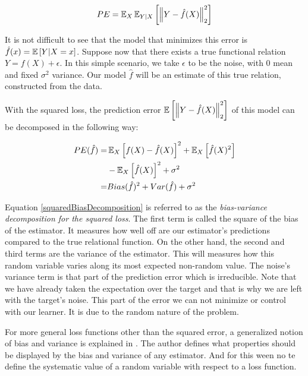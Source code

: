 \begin{equation}\label{squaredPE}
PE = \operatorname{\mathbb{E}}_X \operatorname{\mathbb{E}}_{Y|X} \left[ \left\Vert  Y - \hat{f}(X)  \right\Vert_2^2 \right]
\end{equation}

It is not difficult to see that the model that minimizes this error is $\hat{f}(x) = \operatorname{\mathbb{E}} \left[ Y | X=x \right] $. Suppose now that there exists a true functional relation $Y = f(X) + \epsilon$.
In this simple scenario, we take $\epsilon$ to be the noise, with $0$ mean and fixed $\sigma^2$ variance. Our model $\hat{f}$ will be an estimate of this true relation, constructed from the data.

With the squared loss, the prediction error $\operatorname{\mathbb{E}} \left[ \left\Vert Y  - \hat{f}(X) \right\Vert_2^2 \right]$ of this model can be decomposed in the following way:

\begin{equation}\label{squaredBiasDecomposition}
\begin{split}
PE( \hat{f} ) = & \operatorname{\mathbb{E}}_X \left[   f(X)  - \hat{f}(X) \right]^2 +  \operatorname{\mathbb{E}}_X \left[ \hat{f}(X)^2  \right] \\
& - \operatorname{\mathbb{E}}_X \left[ \hat{f}(X)  \right]^2  + \sigma^2 \\
= & Bias(\hat{f})^2 + Var(\hat{f}) + \sigma^2
\end{split}
\end{equation}

Equation \ref{squaredBiasDecomposition} is referred to as the \textit{bias-variance decomposition for the squared loss}. The first term is called the square of the bias of the estimator. It measures how well off are our estimator's predictions compared to the true relational function. On the other hand, the second and third terms are the variance of the estimator. This will measures how this random variable varies along its most expected non-random value. The noise's variance term is that part of the prediction error which is irreducible. Note that we have already taken the expectation over the target and that is why we are left with the target's noise. This part of the error we can not minimize or control with our learner. It is due to the random nature of the problem.

For more general loss functions other than the squared error, a generalized notion of bias and variance is explained in \textcite{james-biasVarianceGeneral}. The author defines what properties should be displayed by the bias and variance of any estimator. And for this ween no te define the systematic value of a random variable with respect to a loss function.

